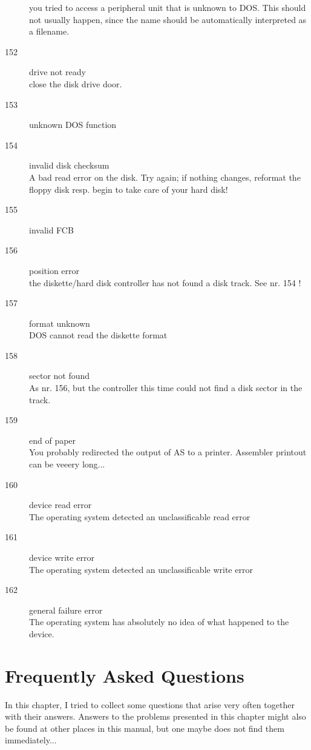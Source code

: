 \documentclass[12pt,twoside]{report}
\newcommand{\asname}{{AS}}
\begin{document}
\begin{description}
{         you tried to access a peripheral unit that is unknown to DOS. This
         should not usually happen, since the name should be automatically
         interpreted as a filename.}
\item[152]{drive not ready\\
         close the disk drive door.}
\item[153]{unknown DOS function}
\item[154]{invalid disk checksum\\
         A bad read error on the disk. Try again; if nothing changes,
         reformat the floppy disk resp. begin to take care of your hard
         disk!}
\item[155]{invalid FCB}
\item[156]{position error\\
         the diskette/hard disk controller has not found a disk track. See
         nr. 154 !}
\item[157]{format unknown\\
         DOS cannot read the diskette format}
\item[158]{sector not found\\
         As nr. 156, but the controller this time could not find a disk
         sector in the track.}
\item[159]{end of paper\\
         You probably redirected the output of \asname{} to a printer. Assembler
         printout can be veeery long...}
\item[160]{device read error\\
         The operating system detected an unclassificable read error}
\item[161]{device write error\\
         The operating system detected an unclassificable write error}
\item[162]{general failure error\\
         The operating system has absolutely no idea of what happened to the
         device.}
\end{description}


\cleardoublepage
\chapter{Frequently Asked Questions}

In this chapter, I tried to collect some questions that arise very often
together with their answers.  Answers to the problems presented in
this chapter might also be found at other places in this manual, but
one maybe does not find them immediately...
\end{document}
